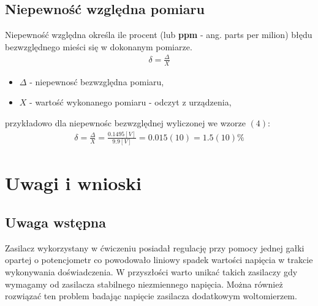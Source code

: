 \documentclass[11pt]{article}
\begin{document}
    \subsection*{Niepewność względna pomiaru}
    \par{
        Niepewność względna określa ile procent (lub \textbf{ppm} - ang. parts per milion) błędu bezwzględnego mieści się w dokonanym pomiarze.
    }
    \begin{gather}
        \delta=\frac{\Delta}{X}
    \end{gather}
    {\footnotesize
        \begin{itemize}
            \setlength\itemsep{0em}
            \item[] \boldmath$\Delta$ - niepewnosć bezwzględna pomiaru,
            \item[] \boldmath$X$ - wartość wykonanego pomiaru - odczyt z urządzenia,
        \end{itemize}}
    \par{\noindent
        przykładowo dla niepewnośc bezwzględnej wyliczonej we wzorze $(4)$:
    }
    \begin{gather}
        \delta=\frac{\Delta}{X}=\frac{0.1495[V]}{9.9[V]}=0.015(10)=1.5(10)\%
    \end{gather}
    \section{Uwagi i wnioski}
    \subsection*{Uwaga wstępna}
    Zasilacz wykorzystany w ćwiczeniu posiadał regulację przy pomocy jednej gałki
    opartej o potencjometr co powodowało liniowy spadek wartości napięcia w trakcie
    wykonywania doświadczenia. W przyszłości warto unikać takich zasilaczy gdy wymagamy
    od zasilacza stabilnego niezmiennego napięcia. Można również rozwiązać ten problem
    badając napięcie zasilacza dodatkowym woltomierzem.
\end{document}
